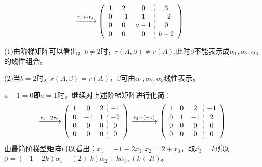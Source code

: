 \documentclass[a4paper]{report}
\begin{document}
\begin{jie}
\begin{align*}
&\xrightarrow{\substack{r_{3}\leftrightarrow r_{4}}}
{
\left(
 \begin{array}{c:c}
\begin{matrix}
1 & 2 & 0\\
0 & -1 & 1 \\
0 & 0 & a-1\\
0 & 0 & 0
\end{matrix}&
\begin{matrix}
3  \\
-2  \\
0\\
b-2
\end{matrix}
\end{array}
\right)
}
\end{align*}

(1)由阶梯矩阵可以看出，$b\neq 2$时，$r(A,\beta)\neq r(A)$,此时$\beta$不能表示成$\alpha_1,\alpha_2,\alpha_3$的线性组合。

(2)当$b=2$时，$r(A,\beta)= r(A)$，$\beta$可由$\alpha_1,\alpha_2,\alpha_3$线性表示。

$a-1=0$即$a=1$时，继续对上述阶梯矩阵进行化简：\begin{equation*}
\xrightarrow{\substack{r_{1}+2 r_{2}}}
{
\left(
 \begin{array}{c:c}
\begin{matrix}
1 & 0 & 2\\
0 & -1 & 1 \\
0 & 0 & 0\\
0 & 0 & 0
\end{matrix}&
\begin{matrix}
-1 \\
-2  \\
0\\
0
\end{matrix}
\end{array}
\right)
}\xrightarrow{\substack{r_{2}\times(-1)}}
{
\left(
 \begin{array}{c:c}
\begin{matrix}
1 & 0 & 2\\
0 & 1 & -1 \\
0 & 0 & 0\\
0 & 0 & 0
\end{matrix}&
\begin{matrix}
-1 \\
2  \\
0\\
0
\end{matrix}
\end{array}
\right)
}
\end{equation*}
由最简阶梯型矩阵可以看出：$x_1=-1-2x_3,x_2=2+x_3$，取$x_3=k$所以$\beta=(-1-2k)\alpha_{1}+(2+k)\alpha_{2}+k\alpha_3,(k\in R)$。


\end{jie}
\end{document}
